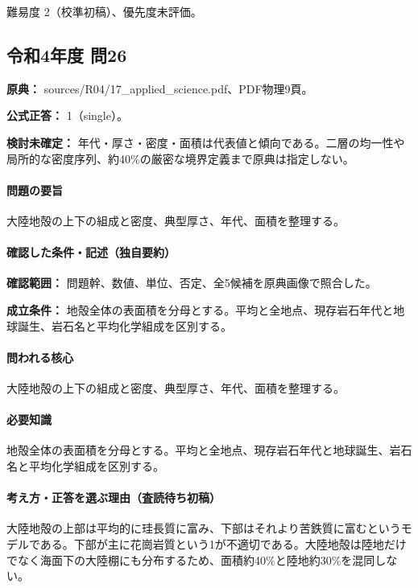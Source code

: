\par 難易度 2（校準初稿）、優先度未評価。

\subsection{令和4年度 問26}
\label{q:r04-reg-applied-26}

\noindent\textbf{原典：} sources/R04/17\_applied\_science.pdf、PDF物理9頁。

\textbf{公式正答：} 1（single）。

\par\textbf{検討未確定：} 年代・厚さ・密度・面積は代表値と傾向である。二層の均一性や局所的な密度序列、約40\%の厳密な境界定義まで原典は指定しない。

\paragraph{問題の要旨} 大陸地殻の上下の組成と密度、典型厚さ、年代、面積を整理する。

\paragraph{確認した条件・記述（独自要約）}\mbox{}\par

\noindent\textbf{確認範囲：} 問題幹、数値、単位、否定、全5候補を原典画像で照合した。\par

\noindent\textbf{成立条件：} 地殻全体の表面積を分母とする。平均と全地点、現存岩石年代と地球誕生、岩石名と平均化学組成を区別する。\par

\paragraph{問われる核心} 大陸地殻の上下の組成と密度、典型厚さ、年代、面積を整理する。

\paragraph{必要知識} 地殻全体の表面積を分母とする。平均と全地点、現存岩石年代と地球誕生、岩石名と平均化学組成を区別する。

\paragraph{考え方・正答を選ぶ理由（査読待ち初稿）} 大陸地殻の上部は平均的に珪長質に富み、下部はそれより苦鉄質に富むというモデルである。下部が主に花崗岩質という1が不適切である。大陸地殻は陸地だけでなく海面下の大陸棚にも分布するため、面積約40\%と陸地約30\%を混同しない。

